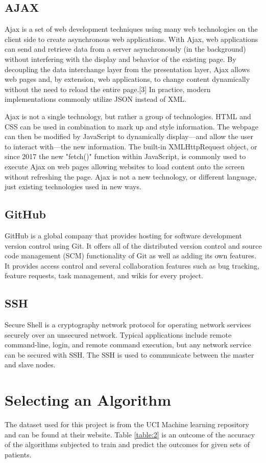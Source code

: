 \documentclass[12pt]{article}
\begin{document}
\subsection{AJAX}
Ajax is a set of web development techniques using many web technologies on the client side to create asynchronous web applications. With Ajax, web applications can send and retrieve data from a server asynchronously (in the background) without interfering with the display and behavior of the existing page. By decoupling the data interchange layer from the presentation layer, Ajax allows web pages and, by extension, web applications, to change content dynamically without the need to reload the entire page.[3] In practice, modern implementations commonly utilize JSON instead of XML.

Ajax is not a single technology, but rather a group of technologies. HTML and CSS can be used in combination to mark up and style information. The webpage can then be modified by JavaScript to dynamically display—and allow the user to interact with—the new information. The built-in XMLHttpRequest object, or since 2017 the new "fetch()" function within JavaScript, is commonly used to execute Ajax on web pages allowing websites to load content onto the screen without refreshing the page. Ajax is not a new technology, or different language, just existing technologies used in new ways.

\subsection{GitHub}
GitHub is a global company that provides hosting for software development version control using Git. It offers all of the distributed version control and source code management (SCM) functionality of Git as well as adding its own features. It provides access control and several collaboration features such as bug tracking, feature requests, task management, and wikis for every project.

\subsection{SSH}
Secure Shell is a cryptography network protocol for operating network services securely over an unsecured network. Typical applications include remote command-line, login, and remote command execution, but any network service can be secured with SSH. The SSH is used to communicate between the master and slave nodes.

\newpage
\section{Selecting an Algorithm}
The dataset used for this project is from the UCI Machine learning repository and can be found at their website. Table \ref{table:2} is an outcome of the accuracy of the algorithms subjected to train and predict the outcomes for given sets of patients. 
\end{document}
